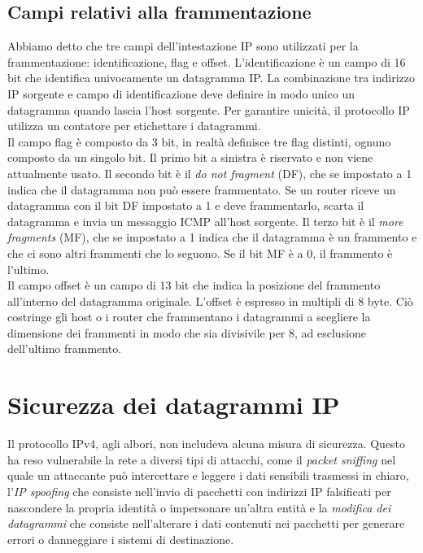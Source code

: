 \documentclass[12pt]{report}
\begin{document}
\subsection{Campi relativi alla frammentazione}
Abbiamo detto che tre campi dell'intestazione IP sono utilizzati per la frammentazione: identificazione, flag e offset. L'identificazione è un campo di 16 bit che identifica univocamente un datagramma IP. La combinazione tra indirizzo IP sorgente e campo di identificazione deve definire in modo unico un datagramma quando lascia l'host sorgente. Per garantire unicità, il protocollo IP utilizza un contatore per etichettare i datagrammi.
\vspace{\baselineskip}\\
Il campo flag è composto da 3 bit, in realtà definisce tre flag distinti, ognuno composto da un singolo bit. Il primo bit a sinistra è riservato e non viene attualmente usato. Il secondo bit è il \textit{do not fragment} (DF), che se impostato a 1 indica che il datagramma non può essere frammentato. Se un router riceve un datagramma con il bit DF impostato a 1 e deve frammentarlo, scarta il datagramma e invia un messaggio ICMP all'host sorgente. Il terzo bit è il \textit{more fragments} (MF), che se impostato a 1 indica che il datagramma è un frammento e che ci sono altri frammenti che lo seguono. Se il bit MF è a 0, il frammento è l'ultimo.
\vspace{\baselineskip}\\
Il campo offset è un campo di 13 bit che indica la posizione del frammento all'interno del datagramma originale. L'offset è espresso in multipli di 8 byte. Ciò costringe  gli host o i router che frammentano i datagrammi a scegliere la dimensione dei frammenti in modo che sia divisivile per 8, ad esclusione dell'ultimo frammento.

\section{Sicurezza dei datagrammi IP}
Il protocollo IPv4, agli albori, non includeva alcuna misura di sicurezza. Questo ha reso vulnerabile la rete a diversi tipi di attacchi, come il \textit{packet sniffing} nel quale un attaccante può intercettare e leggere i dati sensibili trasmessi in chiaro, l'\textit{IP spoofing} che consiste nell'invio di pacchetti con indirizzi IP falsificati per nascondere la propria identità o impersonare un'altra entità e la \textit{modifica dei datagrammi} che consiste nell'alterare i dati contenuti nei pacchetti per generare errori o danneggiare i sistemi di destinazione.
\end{document}
